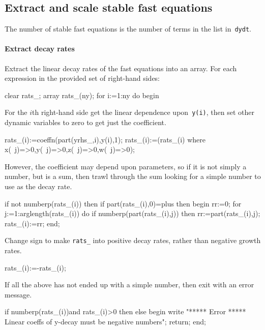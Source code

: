 \documentclass[11pt,a5paper]{article}
\begin{document}
\subsection{Extract and scale stable fast equations}

The number of stable fast equations is the number of terms
in the list in~\verb|dydt|.

\paragraph{Extract decay rates}
Extract the linear decay rates of the fast equations into an
array. For each expression in the provided set of right-hand
sides:
\begin{reduce}
clear rats_; array rats_(ny);
for i:=1:ny do begin
\end{reduce}

For the $i$th right-hand side get the linear dependence
upon~\verb|y(i)|, then set other dynamic variables to zero
to get just the coefficient.
\begin{reduce}
  rats_(i):=coeffn(part(yrhs_,i),y(i),1);
  rats_(i):=(rats_(i) where {x(~j)=>0,y(~j)=>0,z(~j)=>0,w(~j)=>0});
\end{reduce}

However, the coefficient may depend upon parameters, so if
it is not simply a number, but is a sum, then trawl through
the sum looking for a simple number to use as the decay
rate.
\begin{reduce}
  if not numberp(rats_(i)) then 
  if part(rats_(i),0)=plus then begin
    rr:=0;
    for j:=1:arglength(rats_(i)) do 
      if numberp(part(rats_(i),j)) 
      then rr:=part(rats_(i),j);
    rats_(i):=rr;
  end;
\end{reduce}

Change sign to make \verb|rats_| into positive decay rates,
rather than negative growth rates.
\begin{reduce}
  rats_(i):=-rats_(i); 
\end{reduce}

If all the above has not ended up with a simple number, then
exit with an error message. 
\begin{reduce}
  if numberp(rats_(i))and rats_(i)>0 then
  else begin 
    write "***** Error *****
    Linear coeffs of y-decay must be negative numbers";
    return;
  end;
\end{reduce}
\end{document}
